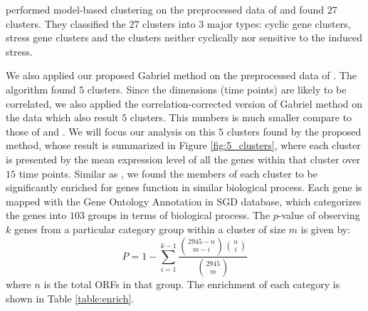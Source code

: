 \documentclass[12pt]{article}
\begin{document}
\cite{dortet2008model} performed model-based clustering on the preprocessed data of \cite{tavazoie1999systematic} and  found $27$ clusters. They classified the $27$ clusters into $3$ major types: cyclic gene clusters, stress gene clusters and the clusters neither cyclically nor sensitive to the induced stress. 

We also applied our proposed Gabriel method on the preprocessed data of \cite{tavazoie1999systematic}. The algorithm found $5$ clusters. Since the dimensions (time points) are likely to be correlated, we also applied the correlation-corrected version of Gabriel method on the data which also result $5$ clusters. This numbers is much smaller compare to those of \cite{tavazoie1999systematic} and \cite{dortet2008model}. We will focus our analysis on this $5$ clusters found by the proposed method, whose result is summarized in Figure \ref{fig:5_clusters}, where each cluster is presented by the mean expression level of all the genes within that cluster over $15$ time points. Similar as \cite{tavazoie1999systematic}, we found the members of each cluster to be significantly enriched for genes function in similar biological process. Each gene is mapped with the Gene Ontology Annotation in SGD database, which categorizes the genes into $103$ groups in terms of biological process. The $p$-value of observing $k$ genes from a particular category group within a cluster of size $m$ is given by:
\[	P = 1-\sum^{k-1}_{i=1} \frac{{{2945-n}\choose{m-i}}{{n}\choose{i}} }{ {{2945} \choose{m}} }\] 
where $n$ is the total ORFs in that group. The enrichment of each category is shown in Table \ref{table:enrich}.
\end{document}
